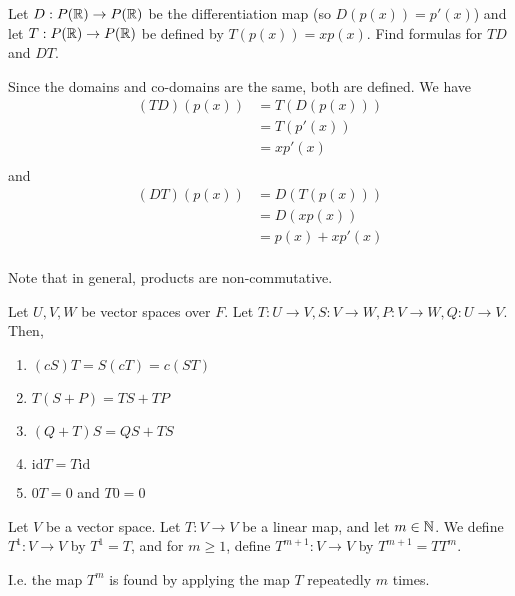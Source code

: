 \documentclass{article}
\begin{document}
\begin{example}
  Let $D: P(\mathbb{R}) \to P(\mathbb{R})$ be the differentiation map (so $D(p(x)) = p'(x)$) and let $T: P(\mathbb{R}) \to P(\mathbb{R})$ be defined by $T(p(x)) = xp(x)$. Find formulas for $TD$ and $DT$.

  Since the domains and co-domains are the same, both are defined.
  We have
  \begin{align*}
    (TD)(p(x)) &= T(D(p(x)))\\
    &= T(p'(x))\\
    &= xp'(x)\\
  \end{align*} and
  \begin{align*}
    (DT)(p(x)) &= D(T(p(x)))\\
    &= D(xp(x))\\
    &= p(x) + xp'(x)\\
  \end{align*}

  Note that in general, products are non-commutative.
\end{example}
\begin{cthm}
  Let $U, V, W$ be vector spaces over $F$. Let $T: U \to V, S: V \to W, P: V \to W, Q: U \to V$.
  Then,
  \begin{enumerate}
    \item $(cS)T = S(cT) = c(ST)$
    \item $T(S + P) = TS + TP$
    \item $(Q + T)S = QS + TS$
    \item $\mathrm{id}T = T\mathrm{id}$
    \item $0T = 0$ and $T0 = 0$
  \end{enumerate}
\end{cthm}
\begin{definition}
  Let $V$ be a vector space. Let $T: V \to V$ be a linear map, and let $m \in \mathbb{N}$. We define $T^1: V \to V$ by $T^1 = T$, and for $m \geq 1$, define $T^{m+1}: V \to V$ by $T^{m+1} = TT^m$.

  I.e. the map $T^m$ is found by applying the map $T$ repeatedly $m$ times.
\end{definition}
\end{document}
